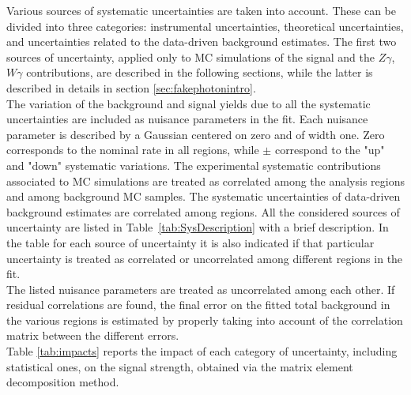 
Various sources of systematic uncertainties are taken into account. These can be divided into three categories: instrumental uncertainties, theoretical uncertainties, and uncertainties related to the data-driven background estimates. The first two sources of uncertainty, applied only to MC simulations of the signal and the $Z\gamma$, $W\gamma$ contributions, are described in the following sections, while the latter is described in details in section \ref{sec:fakephotonintro}. \\
The variation of the background and signal yields due to all the systematic uncertainties are included as nuisance parameters in the fit. Each nuisance parameter is described by a Gaussian centered on zero and of width one. Zero corresponds to the nominal rate in all regions, while $\pm$ correspond to the "up" and "down" systematic variations.
The experimental systematic contributions associated to MC simulations are treated as correlated among the analysis regions and among background MC samples. The systematic uncertainties of data-driven background estimates are correlated among regions. 
All the considered sources of uncertainty are listed in Table~\ref{tab:SysDescription} with a brief description.
In the table for each source of uncertainty it is also indicated if that particular uncertainty is treated as correlated or uncorrelated among different regions in the fit. \\
The listed nuisance parameters are treated as uncorrelated among each other. If residual correlations are found, the final error on the fitted total background in the various regions is estimated by properly taking into account of the correlation matrix between the different errors.\\
Table \ref{tab:impacts} reports the impact of each category of uncertainty, including statistical ones, on the signal strength, obtained via the matrix element decomposition method. 
\\

